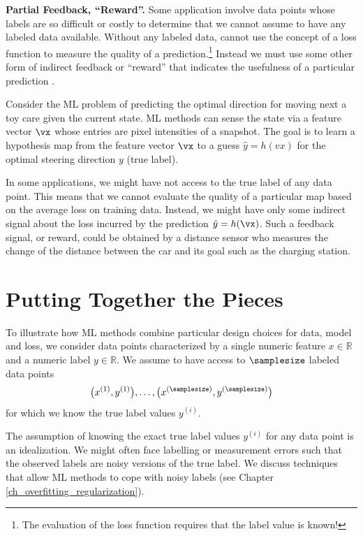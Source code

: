 \documentclass[12pt]{report}
\begin{document}
{\bf Partial Feedback, ``Reward''.}  
Some application involve data points whose labels are so 
difficult or costly to determine that we cannot assume to 
have any labeled data available. Without any labeled data, 
cannot use the concept of a loss function to measure the 
quality of a prediction.\footnote{The evaluation of the loss function 
requires that the label value is known!} Instead we must use 
some other form of indirect feedback or ``reward'' that indicates 
the usefulness of a particular prediction \cite{PredictionLearningGames,SuttonEd2}. 

Consider the ML problem of predicting the optimal direction for 
moving next a toy care given the current state. ML methods can sense the 
state via a feature vector $\vx$ whose entries are pixel intensities of a 
snapshot. The goal is to learn a hypothesis map from the feature vector 
$\vx$ to a guess $\hat{y} = h(vx)$ for the optimal steering direction $y$ (true label). 

In some applications, we might have not access to the true label of any 
data point. This means that we cannot evaluate the quality of a particular 
map based on the average loss on training data. Instead, we might have 
only some indirect signal about the loss incurred by the prediction 
$\hat{y}=h(\vx)$. Such a feedback signal, or reward, could be obtained 
by a distance sensor who measures the change of the distance 
between the car and its goal such as the charging station. 

\section{Putting Together the Pieces} 
\label{sec_putting_togehter_the_pieces}

To illustrate how ML methods combine particular design choices for 
data, model and loss, we consider data points characterized by a single 
numeric feature $x \in \mathbb{R}$ and a numeric label $y \in \mathbb{R}$. 
We assume to have access to $\samplesize$ labeled data points 
\begin{equation} 
\big(x^{(1)},y^{(1)}\big),\ldots, \big(x^{(\samplesize)},y^{(\samplesize)}\big)  \label{equ_labeled_data_putting_together}
\end{equation} 
for which we know the true label values $y^{(i)}$. 

The assumption of knowing the exact true label values $y^{(i)}$ 
for any data point is an idealization. We might often face labelling 
or measurement errors such that the observed labels are noisy 
versions of the true label. We discuss techniques that allow ML 
methods to cope with noisy labels (see Chapter \ref{ch_overfitting_regularization}). 
\end{document}
